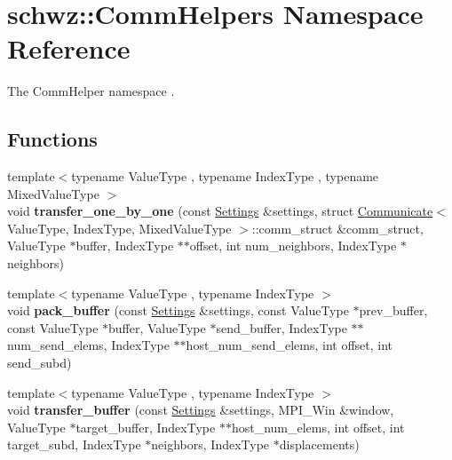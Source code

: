 \hypertarget{namespaceschwz_1_1CommHelpers}{}\section{schwz\+:\+:Comm\+Helpers Namespace Reference}
\label{namespaceschwz_1_1CommHelpers}


The Comm\+Helper namespace .  


\subsection*{Functions}
\begin{DoxyCompactItemize}
\item 
\mbox{\label{namespaceschwz_1_1CommHelpers_ad55122b484f131b8b63e7d82e8ff6e88}} 
{\footnotesize template$<$typename Value\+Type , typename Index\+Type , typename Mixed\+Value\+Type $>$ }\\void {\bfseries transfer\+\_\+one\+\_\+by\+\_\+one} (const \hyperlink{structschwz_1_1Settings}{Settings} \&settings, struct \hyperlink{classschwz_1_1Communicate}{Communicate}$<$ Value\+Type, Index\+Type, Mixed\+Value\+Type $>$\+::comm\+\_\+struct \&comm\+\_\+struct, Value\+Type $\ast$buffer, Index\+Type $\ast$$\ast$offset, int num\+\_\+neighbors, Index\+Type $\ast$neighbors)
\item 
\mbox{\label{namespaceschwz_1_1CommHelpers_a95fa62fcdefd833a653b6d19a5009351}} 
{\footnotesize template$<$typename Value\+Type , typename Index\+Type $>$ }\\void {\bfseries pack\+\_\+buffer} (const \hyperlink{structschwz_1_1Settings}{Settings} \&settings, const Value\+Type $\ast$prev\+\_\+buffer, const Value\+Type $\ast$buffer, Value\+Type $\ast$send\+\_\+buffer, Index\+Type $\ast$$\ast$num\+\_\+send\+\_\+elems, Index\+Type $\ast$$\ast$host\+\_\+num\+\_\+send\+\_\+elems, int offset, int send\+\_\+subd)
\item 
\mbox{\label{namespaceschwz_1_1CommHelpers_a48e42ab3e145c65c626520486b5d56fb}} 
{\footnotesize template$<$typename Value\+Type , typename Index\+Type $>$ }\\void {\bfseries transfer\+\_\+buffer} (const \hyperlink{structschwz_1_1Settings}{Settings} \&settings, M\+P\+I\+\_\+\+Win \&window, Value\+Type $\ast$target\+\_\+buffer, Index\+Type $\ast$$\ast$host\+\_\+num\+\_\+elems, int offset, int target\+\_\+subd, Index\+Type $\ast$neighbors, Index\+Type $\ast$displacements)

\end{DoxyCompactItemize}
